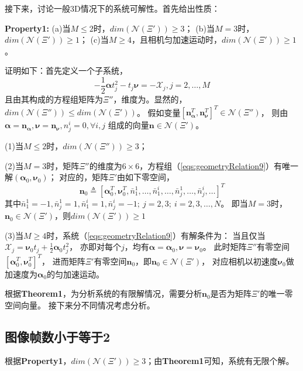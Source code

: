\documentclass{article}
\begin{document}
\newpage
接下来，讨论一般3D情况下的系统可解性。首先给出性质：
\par
\textbf{Property1: } (a)当$M\leqslant 2$时，$dim(\mathcal{N}(\Xi'))\geqslant 3$；
(b)当$M=3$时，$dim(\mathcal{N}(\Xi'))\geqslant 1$；
(c)当$M\geqslant 4$，且相机匀加速运动时，$dim(\mathcal{N}(\Xi'))\geqslant 1$。
\par
证明如下：首先定义一个子系统，
\begin{equation}\label{eqs:geometryRelation9}
    -\frac{1}{2}\mathbf{\alpha}t_j^2-t_j\mathbf{\nu}=-\mathcal{X}_j, j=2,\dots,M
\end{equation}
且由其构成的方程组矩阵为$\Xi''$，维度为{\color{red}{$3(M-1)\times 6$}}。显然的，$dim(\mathcal{N}(\Xi''))\leqslant dim(\mathcal{N}(\Xi'))$。
假如变量$\left[\textbf{n}_\mathbf{\alpha}^T,\textbf{n}_\mathbf{\nu}^T\right]^T\in\mathcal{N}(\Xi'')$，
则由$\mathbf{\alpha}=\textbf{n}_{\mathbf{\alpha}},\mathbf{\nu}=\textbf{n}_{\mathbf{\nu}},n_j^i=0, \forall i,j$
组成的向量$\textbf{n}\in \mathcal{N}(\Xi')$。
\par
(1)当$M\leqslant 2$时，$dim(\mathcal{N}(\Xi''))\geqslant 3$；
\par
(2)当$M=3$时，矩阵$\Xi''$的维度为$6\times 6$，方程组（\ref{eqs:geometryRelation9}）有唯一解$(\mathbf{\alpha}_0,\mathbf{\nu}_0)$；
对应的，矩阵$\Xi'$由如下零空间，
\begin{equation}\label{eqs:zeroSpace}
    \textbf{n}_0\triangleq \left[\mathbf{\alpha}_0^T,\mathbf{\nu}_0^T,\bar{n}_1^1,\dots,\bar{n}_1^i,
    \dots,\bar{n}_j^1,\dots,\bar{n}_j^i,\dots\right]^T
\end{equation}
其中$\bar{n}_1^1=-1,\bar{n}_j^1=1,\bar{n}_1^i=1,\bar{n}_j^i=-1;\ j=2,3;\ i=2,3,\dots,N$。
即当$M=3$时，$\textbf{n}_0\in \mathcal{N}(\Xi')$，则$dim(\mathcal{N}(\Xi'))\geqslant 1$
\par
(3)当$M\geqslant 4$时，系统（\ref{eqs:geometryRelation9}）有解条件为：
当且仅当$\mathcal{X}_j=\mathbf{\nu}_{0}t_{j}+\frac{1}{2}\mathbf{\alpha}_0t_j^2$，
亦即对每个$j$，均有$\mathbf{\alpha}=\mathbf{\alpha}_0, \mathbf{\nu}=\mathbf{\nu}_0$。
此时矩阵$\Xi''$有零空间$\left[\mathbf{\alpha}_0^T,\mathbf{\nu}_0^T\right]^T$，
进而矩阵$\Xi'$有零空间$\textbf{n}_0$，即$\textbf{n}_0\in \mathcal{N}(\Xi')$，
对应相机以初速度$\mathbf{\nu}_0$做加速度为$\mathbf{\alpha}_0$的匀加速运动。

\par
根据\textbf{Theorem1}，为分析系统的有限解情况，需要分析$\textbf{n}_0$是否为矩阵$\Xi'$的唯一零空间向量。
接下来分不同情况考虑分析。

\subsection{图像帧数小于等于2}
根据\textbf{Property1}，$dim(\mathcal{N}(\Xi'))\geqslant 3$；由\textbf{Theorem1}可知，系统有无限个解。
\end{document}
